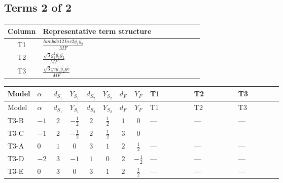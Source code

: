 \documentclass[8pt]{article}
\begin{document}
\begin{landscape}
\subsection*{Terms 2 of 2}
\begin{center}
\begin{tabular}{@{}c >{\raggedright\arraybackslash}p{0.82\linewidth}@{}}
\toprule
Column & Representative term structure \\
\midrule
T1 & \(\displaystyle \frac{lambda12Inv2 \overline{y_{1}} \overline{y_{2}}}{MF}\) \\
\midrule
T2 & \(\displaystyle \frac{\sqrt{3} g_{2}^{2} \overline{y_{1}} \overline{y_{2}}}{MF}\) \\
\midrule
T3 & \(\displaystyle \frac{\sqrt{3} ye \overline{y_{1}} \overline{y_{2}} \overline{ye}}{MF}\) \\
\midrule
\bottomrule
\end{tabular}
\end{center}
\smallskip
\tiny
\begin{longtable}{@{}llcccccc >{\raggedright\arraybackslash}p{0.21\linewidth} >{\raggedright\arraybackslash}p{0.21\linewidth} >{\raggedright\arraybackslash}p{0.21\linewidth}@{}}
\toprule
Model & $\alpha$ & $d_{S_1}$ & $Y_{S_1}$ & $d_{S_2}$ & $Y_{S_2}$ & $d_F$ & $Y_F$ & T1 & T2 & T3 \\
\midrule
\endfirsthead
\toprule
Model & $\alpha$ & $d_{S_1}$ & $Y_{S_1}$ & $d_{S_2}$ & $Y_{S_2}$ & $d_F$ & $Y_F$ & T1 & T2 & T3 \\
\midrule
\endhead
T3-B & $-1$ & $2$ & $-\frac{1}{2}$ & $2$ & $\frac{1}{2}$ & $1$ & $0$ & --- & --- & --- \\
\midrule
T3-C & $-1$ & $2$ & $-\frac{1}{2}$ & $2$ & $\frac{1}{2}$ & $3$ & $0$ & \scriptsize\adjustbox{max width=\linewidth}{$\begin{gathered} - \frac{lambda12Inv2 \overline{y_{1}} \overline{y_{2}}}{3 MF}\end{gathered}$} & \scriptsize\adjustbox{max width=\linewidth}{$\begin{gathered} - \frac{\sqrt{3} g_{2}^{2} \overline{y_{1}} \overline{y_{2}}}{4 MF}\end{gathered}$} & \scriptsize\adjustbox{max width=\linewidth}{$\begin{gathered} \frac{\sqrt{3} ye \overline{y_{1}} \overline{y_{2}} \overline{ye}}{12 MF}\end{gathered}$} \\
\midrule
T3-A & $0$ & $1$ & $0$ & $3$ & $1$ & $2$ & $\frac{1}{2}$ & --- & --- & --- \\
\midrule
T3-D & $-2$ & $3$ & $-1$ & $1$ & $0$ & $2$ & $-\frac{1}{2}$ & --- & --- & --- \\
\midrule
T3-E & $0$ & $3$ & $0$ & $3$ & $1$ & $2$ & $\frac{1}{2}$ & --- & --- & --- \\
\midrule
\bottomrule
\end{longtable}
\clearpage

\end{landscape}
\end{document}
